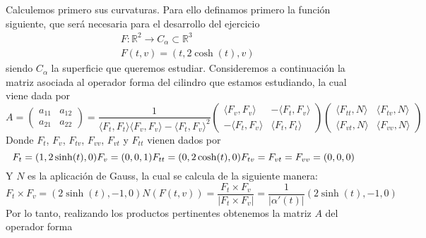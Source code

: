 \documentclass[fleqn]{article}
\def\R{\mathds{R}}
\begin{document}
    Calculemos primero sus curvaturas. Para ello definamos primero la función siguiente, que será necesaria para el desarrollo del ejercicio
    \begin{equation*}
        \begin{aligned}
            & F:\R^2 \rightarrow C_{\alpha} \subset \R^3 \\
            &F(t,v) = (t, 2\cosh(t), v)
        \end{aligned}
    \end{equation*}
    siendo $C_{\alpha}$ la superficie que queremos estudiar. Consideremos a continuación la matriz asociada al operador forma del cilindro que estamos estudiando, 
    la cual viene dada por
    \begin{equation*}
        A =
        \begin{pmatrix}
            a_{11} & a_{12} \\
            a_{21} & a_{22}
        \end{pmatrix}
        = \frac{1}{\langle F_t, F_t \rangle \langle F_v, F_v \rangle - \langle F_t, F_v \rangle ^2}
        \begin{pmatrix}
            \langle F_v, F_v \rangle & - \langle F_t, F_v \rangle \\
            -\langle F_t, F_v \rangle & \langle F_t, F_t \rangle
        \end{pmatrix}
        \begin{pmatrix}
            \langle F_{tt}, N \rangle & \langle F_{tv}, N \rangle \\
            \langle F_{vt}, N \rangle & \langle F_{vv}, N \rangle
        \end{pmatrix}
    \end{equation*}
    Donde $F_t$, $F_v$, $F_{tv}$, $F_{vv}$, $F_{vt}$ y $F_{tt}$ vienen dados por
    \begin{equation*}
        F_t = (1, 2\sinh(t), 0) \\
        F_v = (0, 0, 1) \\
        F_{tt} = (0, 2\cosh(t), 0) \\
        F_{tv} = F_{vt} = F_{vv} = (0, 0, 0)
    \end{equation*}
    Y $N$ es la aplicación de Gauss, la cual se calcula de la siguiente manera:
    \begin{equation*}
        F_t \times F_v = (2\sinh(t), -1, 0)
        N(F(t,v)) = \frac{F_t \times F_v}{|F_t \times F_v|} = \frac{1}{|\alpha'(t)|} (2\sinh(t), -1, 0)
    \end{equation*}
    Por lo tanto, realizando los productos pertinentes obtenemos la matriz $A$ del operador forma
\end{document}
